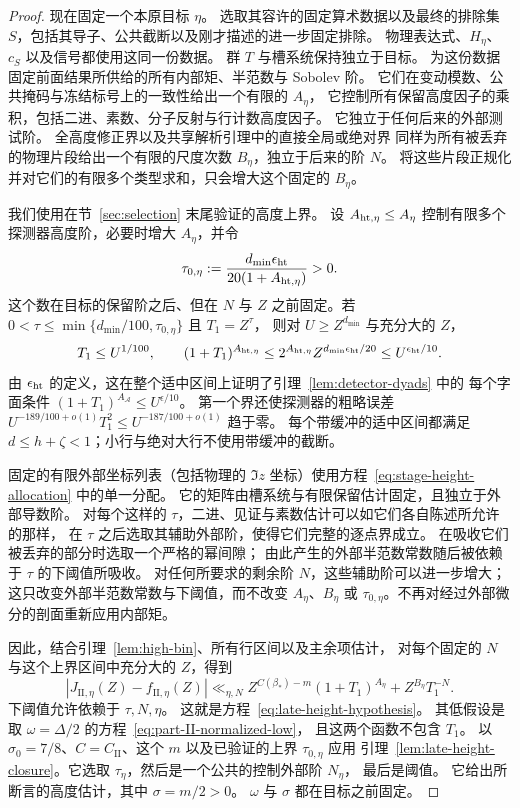 \begin{proof}
现在固定一个本原目标 \(\eta\)。
选取其容许的固定算术数据以及最终的排除集 \(S\)，包括其导子、公共截断以及刚才描述的进一步固定排除。
物理表达式、\(H_\eta\)、\(c_S\) 以及信号都使用这同一份数据。
群 \(T\) 与槽系统保持独立于目标。
为这份数据固定前面结果所供给的所有内部矩、半范数与 Sobolev 阶。
它们在变动模数、公共掩码与冻结标号上的一致性给出一个有限的 \(A_\eta\)，
它控制所有保留高度因子的乘积，包括二进、素数、分子反射与行计数高度因子。
它独立于任何后来的外部测试阶。
全高度修正界以及共享解析引理中的直接全局或绝对界
同样为所有被丢弃的物理片段给出一个有限的尺度次数 \(B_\eta\)，独立于后来的阶 \(N\)。
将这些片段正规化并对它们的有限多个类型求和，只会增大这个固定的 \(B_\eta\)。

我们使用在节~\ref{sec:selection} 末尾验证的高度上界。
设 \(A_{{\rm ht},\eta}\le A_\eta\) 控制有限多个探测器高度阶，必要时增大 \(A_\eta\)，并令
\[
 \tau_{0,\eta}:=
       \frac{d_{\min}\epsilon_{\rm ht}}{20(1+A_{{\rm ht},\eta})}>0.
\]
这个数在目标的保留阶之后、但在 \(N\) 与 \(Z\) 之前固定。若
\(0<\tau\le\min\{d_{\min}/100,\tau_{0,\eta}\}\) 且 \(T_1=Z^\tau\)，
则对 \(U\ge Z^{d_{\min}}\) 与充分大的 \(Z\)，
\[
 T_1\le U^{1/100},\qquad
 (1+T_1)^{A_{{\rm ht},\eta}}
 \le2^{A_{{\rm ht},\eta}}Z^{d_{\min}\epsilon_{\rm ht}/20}
 \le U^{\epsilon_{\rm ht}/10}.
\]
由 \(\epsilon_{\rm ht}\) 的定义，这在整个适中区间上证明了引理~\ref{lem:detector-dyads} 中的
每个字面条件 \((1+T_1)^{A_{\mathcal A}}\le U^{\epsilon/10}\)。
第一个界还使探测器的粗略误差
\(U^{-189/100+o(1)}T_1^2\le U^{-187/100+o(1)}\) 趋于零。
每个带缓冲的适中区间都满足 \(d\le h+\zeta<1\)；小行与绝对大行不使用带缓冲的截断。

固定的有限外部坐标列表（包括物理的 \(\Im z\) 坐标）使用方程~\eqref{eq:stage-height-allocation} 中的单一分配。
它的矩阵由槽系统与有限保留估计固定，且独立于外部导数阶。
对每个这样的 \(\tau\)，二进、见证与素数估计可以如它们各自陈述所允许的那样，
在 \(\tau\) 之后选取其辅助外部阶，使得它们完整的逐点界成立。
在吸收它们被丢弃的部分时选取一个严格的幂间隙；
由此产生的外部半范数常数随后被依赖于 \(\tau\) 的下阈值所吸收。
对任何所要求的剩余阶 \(N\)，这些辅助阶可以进一步增大；
这只改变外部半范数常数与下阈值，而不改变 \(A_\eta\)、\(B_\eta\) 或
\(\tau_{0,\eta}\)。不再对经过外部微分的剖面重新应用内部矩。

因此，结合引理~\ref{lem:high-bin}、所有行区间以及主余项估计，
对每个固定的 \(N\) 与这个上界区间中充分大的 \(Z\)，得到
\[
 |J_{\mathrm{II},\eta}(Z)-f_{\mathrm{II},\eta}(Z)|
 \ll_{\eta,N}
 Z^{C(\beta_*)-m}(1+T_1)^{A_\eta}
       +Z^{B_\eta}T_1^{-N}.
\]
下阈值允许依赖于 \(\tau,N,\eta\)。
这就是方程~\eqref{eq:late-height-hypothesis}。
其低假设是取 \(\omega=\Delta/2\) 的方程~\eqref{eq:part-II-normalized-low}，
且这两个函数不包含 \(T_1\)。
以 \(\sigma_0=7/8\)、\(C=C_{\mathrm{II}}\)、这个 \(m\) 以及已验证的上界 \(\tau_{0,\eta}\) 应用
引理~\ref{lem:late-height-closure}。它选取 \(\tau_\eta\)，然后是一个公共的控制外部阶 \(N_\eta\)，
最后是阈值。
它给出所断言的高度估计，其中 \(\sigma=m/2>0\)。
\(\omega\) 与 \(\sigma\) 都在目标之前固定。
\end{proof}

